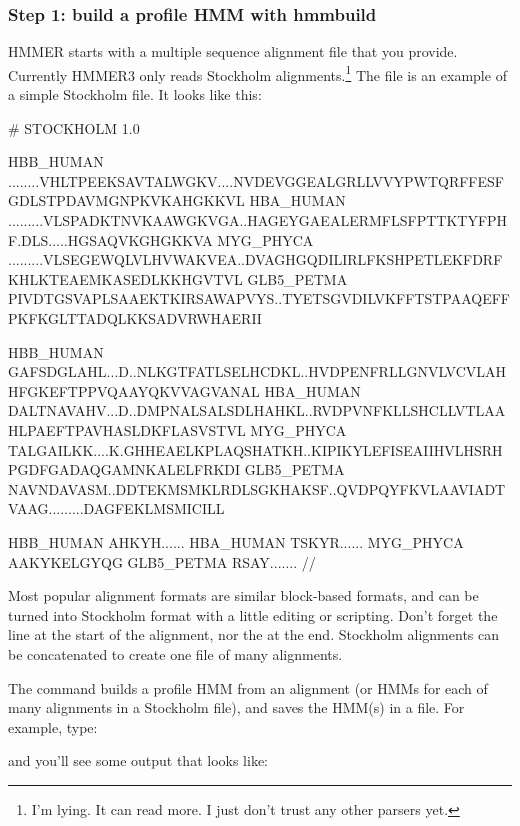 \subsubsection{Step 1: build a profile HMM with hmmbuild}

HMMER starts with a multiple sequence alignment file that you
provide. Currently HMMER3 only reads Stockholm
alignments.\footnote{I'm lying. It can read more. I just don't trust
any other parsers yet.} The file  is an
example of a simple Stockholm file. It looks like this:

\begin{sreoutput}
# STOCKHOLM 1.0

HBB_HUMAN   ........VHLTPEEKSAVTALWGKV....NVDEVGGEALGRLLVVYPWTQRFFESFGDLSTPDAVMGNPKVKAHGKKVL
HBA_HUMAN   .........VLSPADKTNVKAAWGKVGA..HAGEYGAEALERMFLSFPTTKTYFPHF.DLS.....HGSAQVKGHGKKVA
MYG_PHYCA   .........VLSEGEWQLVLHVWAKVEA..DVAGHGQDILIRLFKSHPETLEKFDRFKHLKTEAEMKASEDLKKHGVTVL
GLB5_PETMA  PIVDTGSVAPLSAAEKTKIRSAWAPVYS..TYETSGVDILVKFFTSTPAAQEFFPKFKGLTTADQLKKSADVRWHAERII

HBB_HUMAN   GAFSDGLAHL...D..NLKGTFATLSELHCDKL..HVDPENFRLLGNVLVCVLAHHFGKEFTPPVQAAYQKVVAGVANAL
HBA_HUMAN   DALTNAVAHV...D..DMPNALSALSDLHAHKL..RVDPVNFKLLSHCLLVTLAAHLPAEFTPAVHASLDKFLASVSTVL
MYG_PHYCA   TALGAILKK....K.GHHEAELKPLAQSHATKH..KIPIKYLEFISEAIIHVLHSRHPGDFGADAQGAMNKALELFRKDI
GLB5_PETMA  NAVNDAVASM..DDTEKMSMKLRDLSGKHAKSF..QVDPQYFKVLAAVIADTVAAG.........DAGFEKLMSMICILL

HBB_HUMAN   AHKYH......
HBA_HUMAN   TSKYR......
MYG_PHYCA   AAKYKELGYQG
GLB5_PETMA  RSAY.......
//
\end{sreoutput}


Most popular alignment formats are similar block-based formats, and
can be turned into Stockholm format with a little editing or
scripting. Don't forget the  line at the start
of the alignment, nor the \prog{//} at the end. Stockholm alignments
can be concatenated to create one file of many alignments.


The  command builds a profile HMM from an alignment (or
HMMs for each of many alignments in a Stockholm file), and saves the
HMM(s) in a file. For example, type:


and you'll see some output that looks like:

